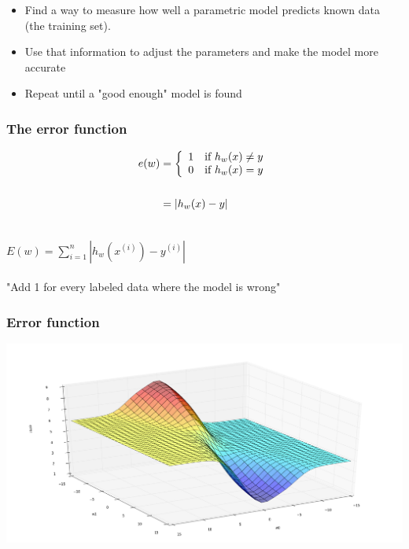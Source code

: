 \begin{frame}
  \begin{itemize}
    \item Find a way to measure how well a parametric model predicts known
      data (the training set).
    \item Use that information to adjust the
      parameters and make the model more accurate
    \item Repeat until a "good enough" model is found
  \end{itemize}
\end{frame}

\begin{frame}
  \frametitle{The error function}
  \begin{center}
    \begin{equation*}
      \begin{split}
        e(w) & =
        \left \{
          \begin{array}{cl}
            1 & $if $ h_w(x) \neq y \\
            0 & $if $ h_w(x) = y
          \end{array}
          \right.\\~\\
          & = |h_w(x) - y| \\~\\
        \end{split}
      \end{equation*}
    \end{center}
  \end{frame}

  \begin{frame}
    \begin{center}
      $E(w) = \displaystyle\sum_{i = 1}^n{|h_w(x^{(i)}) - y^{(i)}|}$ \\~\\
      "Add 1 for every labeled data where the model is wrong"
    \end{center}
  \end{frame}

  \begin{frame}
    \frametitle{Error function}
    \begin{center}
      \includegraphics[scale=0.22]{./pictures/error_abs.png}
    \end{center}
  \end{frame}


